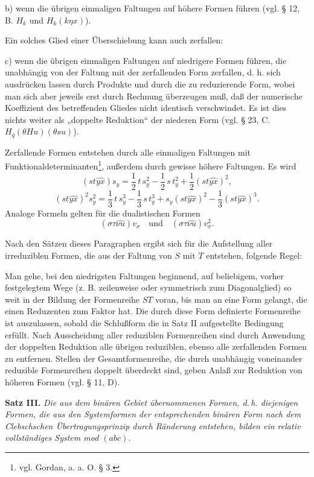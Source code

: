 \documentclass[11pt]{article}
\begin{document}
b) wenn die übrigen einmaligen Faltungen auf höhere Formen führen (vgl. § 12, B. $H_k$ und $H_k(k\eta x)$).

Ein solches Glied einer Überschiebung kann auch zerfallen:

c) wenn die übrigen einmaligen Faltungen auf niedrigere Formen führen, die unabhängig von der Faltung mit der zerfallenden Form zerfallen, d. h. sich ausdrücken lassen durch Produkte und durch die zu reduzierende Form, wobei man sich aber jeweils erst durch Rechnung überzeugen muß, daß der numerische Koeffizient des betreffenden Gliedes nicht identisch verschwindet. Es ist dies nichts weiter als „doppelte Reduktion“ der niederen Form (vgl. § 23, C. $H_q(\theta H u)(\theta s u)$).

Zerfallende Formen entstehen durch alle einmaligen Faltungen mit Funktionaldeterminanten\footnote{vgl. Gordan, a. a. O. § 3.}, außerdem durch gewisse höhere Faltungen. Es wird
\[
(st\widehat{yx})s_y=\frac12\,t\,s_y^2-\frac12\,s\,t_y^2+\frac12(st\widehat{yx})^2,
\]
\[
(st\widehat{yx})^2s_y^2=\frac13\,t\,s_y^3-\frac13\,s\,t_y^3+s_y(st\widehat{yx})^2-\frac13(st\widehat{yx})^3.
\]
Analoge Formeln gelten für die dualistischen Formen
\[
(\sigma\tau\widehat{\nu u})v_\sigma
\quad\text{und}\quad
(\sigma\tau\widehat{\nu u})v_\sigma^2.
\]

Nach den Sätzen dieses Paragraphen ergibt sich für die Aufstellung aller irreduziblen Formen, die aus der Faltung von $S$ mit $T$ entstehen, folgende Regel:

Man gehe, bei den niedrigsten Faltungen beginnend, auf beliebigem, vorher festgelegtem Wege (z. B. zeilenweise oder symmetrisch zum Diagonalglied) so weit in der Bildung der Formenreihe $ST$ voran, bis man an eine Form gelangt, die einen Reduzenten zum Faktor hat. Die durch diese Form definierte Formenreihe ist auszulassen, sobald die Schlußform die in Satz II aufgestellte Bedingung erfüllt. Nach Ausscheidung aller reduziblen Formenreihen sind durch Anwendung der doppelten Reduktion alle übrigen reduziblen, ebenso alle zerfallenden Formen zu entfernen. Stellen der Gesamtformenreihe, die durch unabhängig voneinander reduzible Formenreihen doppelt überdeckt sind, geben Anlaß zur Reduktion von höheren Formen (vgl. § 11, D).


\clearpage
\noindent\textbf{Satz III.}
\emph{Die aus dem binären Gebiet übernommenen Formen, d.\,h. diejenigen Formen, die aus den Systemformen der entsprechenden binären Form nach dem Clebschschen Übertragungsprinzip durch Ränderung entstehen, bilden ein relativ vollständiges System mod $(abc)$.}
\end{document}
